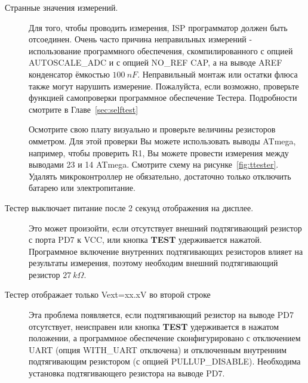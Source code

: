\begin{description}
\item[Странные значения измерений.]
Для того, чтобы проводить измерения, ISP программатор должен быть отсоединен. Очень часто причина неправильных 
измерений - использование программного обеспечения, скомпилированного с опцией AUTOSCALE\_ADC и с опцией NO\_REF CAP, 
а на выводе AREF конденсатор ёмкостью \(100~nF\). Неправильный монтаж или остатки флюса также могут нарушить 
измерение. Пожалуйста, если возможно, проверьте функцией самопроверки программное обеспечение Тестера. Подробности 
смотрите в Главе~\ref{sec:selftest}

Осмотрите свою плату визуально и проверьте величины резисторов омметром. Для этой проверки Вы можете использовать 
выводы ATmega, например, чтобы проверить R1, Вы можете провести измерения между выводами 23 и 14 ATmega. Смотрите 
схему на рисунке~\ref{fig:ttester}. Удалять микроконтроллер не обязательно, достаточно только отключить батарею 
или электропитание.

\item[Тестер выключает питание после 2 секунд отображения на дисплее.] 
Это может произойти, если отсутствует внешний подтягивающий резистор с порта PD7 к VCC, или кнопка \textbf{ TEST} 
удерживается нажатой. Программное включение внутренних подтягивающих резисторов влияет на результаты измерения, 
поэтому необходим внешний подтягивающий резистор \(27~k\Omega\). 

\item[Тестер отображает только Vext=xx.xV во второй строке]
Эта проблема появляется, если подтягивающий резистор на выводе PD7
отсутствует, неисправен или кнопка \textbf{ TEST} удерживается в нажатом положении,
а программное обеспечение сконфигурировано с отключением UART (опция WITH\_UART отключена)
и отключенным внутренним подтягивающим резистором (с опцией PULLUP\_DISABLE). 
Необходима установка подтягивающего резистора на выводе PD7.

\end{description}
